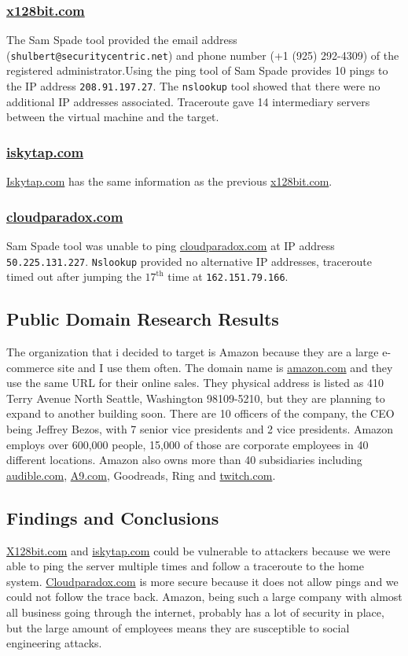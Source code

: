 \documentclass[a4paper]{article}
\begin{document}
	\subsubsection{\url{x128bit.com}}
	The Sam Spade tool provided the email address (\texttt{shulbert@securitycentric.net}) and phone number
	(+1 (925) 292-4309) of the registered administrator.Using the ping tool of Sam Spade provides 10 pings
	to the IP address \texttt{208.91.197.27}. The \texttt{nslookup} tool showed that there
	were no additional IP addresses associated. Traceroute gave 14 intermediary servers between
	the virtual machine and the target.
	
	\subsubsection{\url{iskytap.com}}
	\url{Iskytap.com} has the same information as the previous \url{x128bit.com}.	
	
	\subsubsection{\url{cloudparadox.com}}
	Sam Spade tool was unable to ping \url{cloudparadox.com} at IP address \texttt{50.225.131.227}.
	\texttt{Nslookup} provided no alternative IP addresses, traceroute timed out after jumping
	the $17^{\text{th}}$  time at \texttt{162.151.79.166}.

	\subsection{Public Domain Research Results}
	\label{PDR1}
	The organization that i decided to target is Amazon because they are a large e-commerce
	site and I use them often. The domain name is \url{amazon.com} and they use the same URL
	for their online sales. They physical address is listed as 410 Terry Avenue North Seattle,
	Washington 98109-5210, but they are planning to expand to another building soon. There are 10
	officers of the company, the CEO being Jeffrey Bezos, with 7 senior vice presidents and 2
	vice presidents. Amazon employs over 600,000 people, 15,000 of those are corporate employees
	in 40 different locations. Amazon also owns more than 40 subsidiaries including \url{audible.com},
	\url{A9.com}, Goodreads, Ring and \url{twitch.com}.

	\subsection{Findings and Conclusions}
	\url{X128bit.com} and \url{iskytap.com} could be vulnerable to attackers because we were able to
	ping the server multiple times and follow a traceroute to the home system. \url{Cloudparadox.com}
	is more secure because it does not allow pings and we could not follow the trace back. Amazon,
	being such a large company with almost all business going through the internet, probably has a 
	lot of security in place, but the large amount of employees means they are susceptible to social
	engineering attacks.
	
\end{document}

